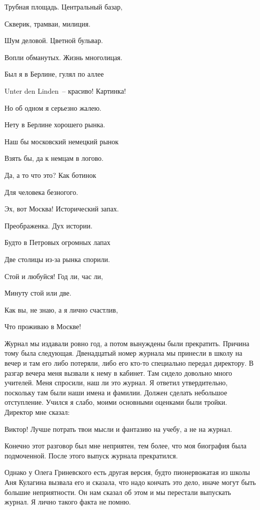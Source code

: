 {\itshape

Трубная площадь. Центральный базар,

Скверик, трамваи, милиция.

Шум деловой. Цветной бульвар.

Вопли обманутых. Жизнь многолицая.



Был я в Берлине, гулял по аллее 

Unter den Linden~-- красиво! Картинка!

Но об одном я серьезно жалею.

Нету в Берлине хорошего рынка.



Наш бы московский немецкий рынок 

Взять бы, да к немцам в логово.

Да, а то что это? Как ботинок 

Для человека безногого.




Эх, вот Москва! Исторический запах. 

Преображенка. Дух истории.

Будто в Петровых огромных лапах 

Две столицы из-за рынка спорили.

Стой и любуйся! Год ли, час ли,

Минуту стой или две.

Как вы, не знаю, а я лично счастлив,

Что проживаю в Москве!
}

\indent

Журнал мы издавали ровно год, а потом вынуждены были прекратить. Причина тому была следующая. Двенадцатый номер журнала мы принесли в школу на вечер и там его либо потеряли, либо его кто-то специально передал директору. В разгар вечера меня вызвали к нему в кабинет. Там сидело довольно много учителей. Меня спросили, наш ли это журнал. Я ответил утвердительно, поскольку там были наши имена и фамилии. Должен сделать небольшое отступление. Учился я слабо, моими основными оценками были тройки. Директор мне сказал:

Виктор! Лучше потрать твои мысли и фантазию на учебу, а не на журнал.

Конечно этот разговор был мне неприятен, тем более, что моя биография была подмоченной. После этого выпуск журнала прекратился.

Однако у Олега Гриневского есть другая версия, будто пионервожатая из школы Аня Кулагина вызвала его и сказала, что надо кончать это дело, иначе могут быть большие неприятности. Он нам сказал об этом и мы перестали выпускать журнал. Я лично такого факта не помню.

